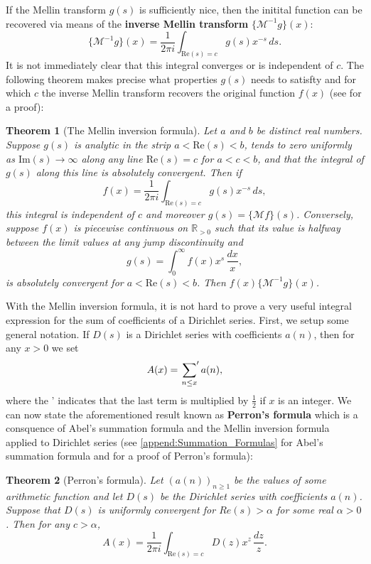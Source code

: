 \documentclass[12pt]{book}
\newtheorem{theorem}{Theorem}[section]
\theoremstyle{definition}\newframedtheorem{method}{Method}
\newcommand{\psum}{\sideset{}{'}\sum}
\newcommand{\mc}{\mathcal}
\newcommand{\R}{\mathbb{R}}
\renewcommand{\a}{\alpha}
\newcommand{\<}{\langle}
\renewcommand{\>}{\rangle}
\renewcommand{\Re}{\mathrm{Re}}
\renewcommand{\Im}{\mathrm{Im}}
\begin{document}
      If the Mellin transform $g(s)$ is sufficiently nice, then the initital function can be recovered via means of the \textbf{inverse Mellin transform} $\{\mc{M}^{-1}g\}(x)$:
      \[
        \{\mc{M}^{-1}g\}(x) = \frac{1}{2\pi i}\int_{\Re(s) = c}g(s)x^{-s}\,ds.
      \]
      It is not immediately clear that this integral converges or is independent of $c$. The following theorem makes precise what properties $g(s)$ needs to satisfty and for which $c$ the inverse Mellin transform recovers the original function $f(x)$ (see \cite{debnath2016integral} for a proof):

      \begin{theorem}[The Mellin inversion formula]
        Let $a$ and $b$ be distinct real numbers. Suppose $g(s)$ is analytic in the strip $a < \Re(s) < b$, tends to zero uniformly as $\Im(s) \to \infty$ along any line $\Re(s) = c$ for $a < c < b$, and that the integral of $g(s)$ along this line is absolutely convergent. Then if
        \[
          f(x) = \frac{1}{2\pi i}\int_{\Re(s) = c}g(s)x^{-s}\,ds,
        \]
        this integral is independent of $c$ and moreover $g(s) = \{\mc{M}f\}(s)$. Conversely, suppose $f(x)$ is piecewise continuous on $\R_{>0}$ such that its value is halfway between the limit values at any jump discontinuity and
        \[
          g(s) = \int_{0}^{\infty}f(x)x^{s}\,\frac{dx}{x},
        \]
        is absolutely convergent for $a < \Re(s) < b$. Then $f(x) \{\mc{M}^{-1}g\}(x)$.
      \end{theorem}

      With the Mellin inversion formula, it is not hard to prove a very useful integral expression for the sum of coefficients of a Dirichlet series. First, we setup some general notation. If $D(s)$ is a Dirichlet series with coefficients $a(n)$, then for any $x > 0$ we set
      \[
        A(x) = \psum_{n \le x}a(n),
      \]
      where the ' indicates that the last term is multiplied by $\frac{1}{2}$ if $x$ is an integer. We can now state the aforementioned result known as \textbf{Perron's formula} which is a consquence of Abel's summation formula and the Mellin inversion formula applied to Dirichlet series (see \cref{append:Summation_Formulas} for Abel's summation formula and \cite{montgomery2007multiplicative} for a proof of Perron's formula):

      \begin{theorem}[Perron's formula]
        Let $(a(n))_{n \ge 1}$ be the values of some arithmetic function and let $D(s)$ be the Dirichlet series with coefficients $a(n)$. Suppose that $D(s)$ is uniformly convergent for $Re(s) > \a$ for some real $\a > 0$. Then for any $c > \a$,
        \[
          A(x) = \frac{1}{2\pi i}\int_{\Re(s) = c}D(z)x^{z}\,\frac{dz}{z}.
        \]
      \end{theorem}
\end{document}
